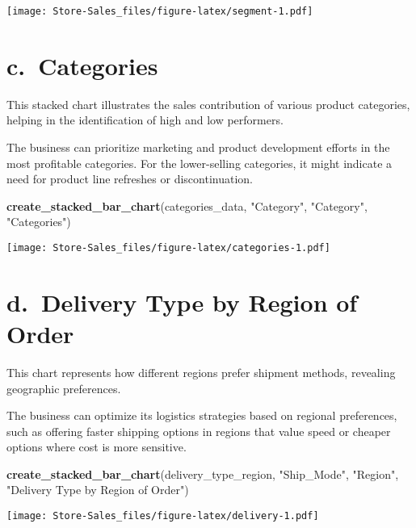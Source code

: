 \documentclass[
]{article}
\newenvironment{Shaded}{\begin{snugshade}}{\end{snugshade}}
\newcommand{\FunctionTok}[1]{\textcolor[rgb]{0.13,0.29,0.53}{\textbf{#1}}}
\newcommand{\NormalTok}[1]{#1}
\newcommand{\StringTok}[1]{\textcolor[rgb]{0.31,0.60,0.02}{#1}}
\begin{document}
\texttt{[image: Store-Sales\_files/figure-latex/segment-1.pdf]}

\hypertarget{c.-categories}{%
\section{c.~Categories}\label{c.-categories}}

This stacked chart illustrates the sales contribution of various product
categories, helping in the identification of high and low performers.

The business can prioritize marketing and product development efforts in
the most profitable categories. For the lower-selling categories, it
might indicate a need for product line refreshes or discontinuation.

\begin{Shaded}
\begin{Highlighting}[]
\FunctionTok{create\_stacked\_bar\_chart}\NormalTok{(categories\_data, }\StringTok{"Category"}\NormalTok{, }\StringTok{"Category"}\NormalTok{, }\StringTok{"Categories"}\NormalTok{)}
\end{Highlighting}
\end{Shaded}

\texttt{[image: Store-Sales\_files/figure-latex/categories-1.pdf]}

\hypertarget{d.-delivery-type-by-region-of-order}{%
\section{d.~Delivery Type by Region of
Order}\label{d.-delivery-type-by-region-of-order}}

This chart represents how different regions prefer shipment methods,
revealing geographic preferences.

The business can optimize its logistics strategies based on regional
preferences, such as offering faster shipping options in regions that
value speed or cheaper options where cost is more sensitive.

\begin{Shaded}
\begin{Highlighting}[]
\FunctionTok{create\_stacked\_bar\_chart}\NormalTok{(delivery\_type\_region, }\StringTok{"Ship\_Mode"}\NormalTok{, }\StringTok{"Region"}\NormalTok{, }\StringTok{"Delivery Type by Region of Order"}\NormalTok{)}
\end{Highlighting}
\end{Shaded}

\texttt{[image: Store-Sales\_files/figure-latex/delivery-1.pdf]}
\end{document}
